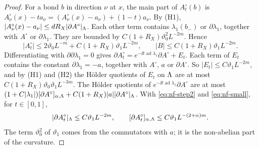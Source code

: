 \begin{proof}
For a bond $b$ in direction $\nu$ at $x$, the main part of $A^\circ_t(b)$ is $A^\circ_\nu(x)-ta_\nu=(A^\circ_\nu(x)-a_\nu)+(1-t)a_\nu$. By (H1), $|A^\circ_\nu(x)-a_\nu|\le dR_X|\partial A^\circ|_\Lambda$. Each other term contains $\lambda_1(b_-)$ or $\partial\lambda_1$, together with $A^\circ$ or $\partial\lambda_1$. They are bounded by $C(1+R_X)\vartheta_0^2L^{-2m}$. Hence
\[
|A^\circ_t|\le2\vartheta_0L^{-m}+C(1+R_X)\vartheta_1L^{-2m},\qquad|B|\le C(1+R_X)\vartheta_1L^{-2m}.
\]
Differentiating with $\partial\partial\lambda_1=0$ gives $\partial A^\circ_t=e^{-\ii t\operatorname{ad}\lambda_1}\partial A^\circ+E_t$. Each term of $E_t$ contains the constant $\partial\lambda_1=-a$, together with $A^\circ$, $a$ or $\partial A^\circ$. So $|E_t|\le C\vartheta_1L^{-2m}$, and by (H1) and (H2) the H\"older quotients of $E_t$ on $\Lambda$ are at most $C(1+R_X)\vartheta_0\vartheta_1L^{-3m}$. The H\"older quotients of $e^{-\ii t\operatorname{ad}\lambda_1}\partial A^\circ$ are at most $(1+C|\lambda_1|)[\partial A^\circ]_{\alpha,\Lambda}+C(1+R_X)|a||\partial A^\circ|_\Lambda$. With \eqref{eq:nf-step2} and \eqref{eq:nf-small}, for $t\in[0,1]$,
\begin{equation}\label{eq:nf-step3}
|\partial A^\circ_t|_\Lambda\le C\vartheta_1L^{-2m},\qquad[\partial A^\circ_t]_{\alpha,\Lambda}\le C\vartheta_1L^{-(2+\alpha)m}.
\end{equation}
The term $\vartheta_0^2$ of $\vartheta_1$ comes from the commutators with $a$; it is the non-abelian part of the curvature.


\end{proof}
